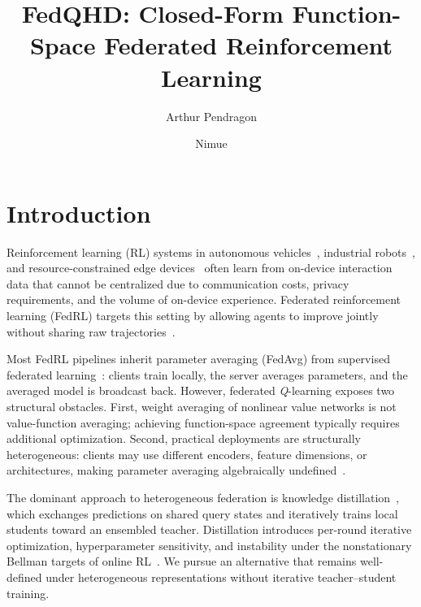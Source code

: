 \documentclass[sigconf,anonymous]{aamas}
\title{FedQHD: Closed-Form Function-Space Federated Reinforcement Learning}
\author{Arthur Pendragon}
\affiliation{
  \institution{Camelot Castle}
  \city{Camelot}
  \country{United Kingdom}}
\author{Nimue}
\affiliation{
  \institution{The Lady's Lake}
  \city{Avalon}
  \country{United Kingdom}}
\theoremstyle{plain}
\theoremstyle{definition}
\theoremstyle{remark}
\begin{document}



\maketitle


\section{Introduction}
\label{sec:intro}
Reinforcement learning (RL) systems in autonomous vehicles~\citep{liang2022federated, chellapandi2023federated}, industrial robots~\citep{liu2019lifelong}, and resource-constrained edge devices~\citep{yu2020deep} often learn from on-device interaction data that cannot be centralized due to communication costs, privacy requirements, and the volume of on-device experience. Federated reinforcement learning (FedRL) targets this setting by allowing agents to improve jointly without sharing raw trajectories~\citep{zhuo2020federated, qi2021federated}.


Most FedRL pipelines inherit parameter averaging (FedAvg) from supervised federated learning~\citep{mcmahan2017communication}: clients train locally, the server averages parameters, and the averaged model is broadcast back. However, federated \emph{Q}-learning exposes two structural obstacles. First, weight averaging of nonlinear value networks is not value-function averaging; achieving function-space agreement typically requires additional optimization. Second, practical deployments are structurally heterogeneous: clients may use different encoders, feature dimensions, or architectures, making parameter averaging algebraically undefined~\citep{fan2023fedhql, jiang2025fedhpd}.


The dominant approach to heterogeneous federation is knowledge distillation~\citep{li2019fedmd, lin2021ensembledistillation, jiang2025fedhpd}, which exchanges predictions on shared query states and iteratively trains local students toward an ensembled teacher. Distillation introduces per-round iterative optimization, hyperparameter sensitivity, and instability under the nonstationary Bellman targets of online RL~\citep{czarnecki2019distilling}. We pursue an alternative that remains well-defined under heterogeneous representations without iterative teacher--student training.
\end{document}
